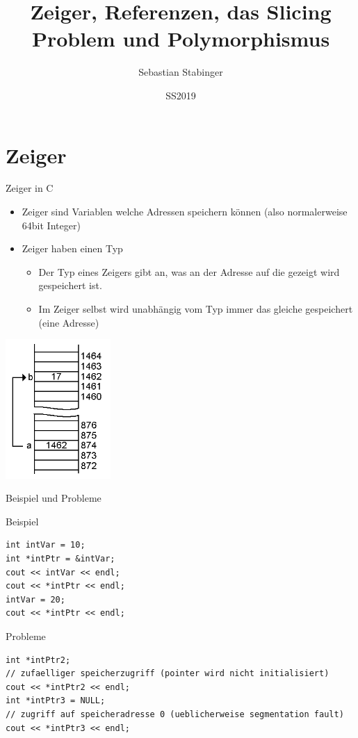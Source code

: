 \documentclass[presentation]{beamer}
\author{Sebastian Stabinger}
\date{SS2019}
\title{Zeiger, Referenzen, das Slicing Problem und Polymorphismus}
\begin{document}
\maketitle
\section{Zeiger}
\label{sec:org67219f1}
\begin{frame}[label={sec:org506cd43}]{Zeiger in C}
\begin{itemize}
\item Zeiger sind Variablen welche Adressen speichern können (also
normalerweise 64bit Integer)
\item Zeiger haben einen Typ
\begin{itemize}
\item Der Typ eines Zeigers gibt an, was an der Adresse auf die gezeigt
wird gespeichert ist.
\item Im Zeiger selbst wird unabhängig vom Typ immer das gleiche
gespeichert (eine Adresse)
\end{itemize}
\end{itemize}
\begin{center}\begin{center}
\includegraphics[width=0.3\textwidth]{img/pointer.png}
\end{center}\end{center}
\end{frame}
\begin{frame}[fragile,label={sec:org4065a98}]{Beispiel und Probleme}
 \begin{block}{Beispiel}
\begin{verbatim}
int intVar = 10;
int *intPtr = &intVar;
cout << intVar << endl;
cout << *intPtr << endl;
intVar = 20;
cout << *intPtr << endl;
\end{verbatim}
\end{block}
\begin{block}{Probleme}
\begin{verbatim}
int *intPtr2;
// zufaelliger speicherzugriff (pointer wird nicht initialisiert)
cout << *intPtr2 << endl;
int *intPtr3 = NULL;
// zugriff auf speicheradresse 0 (ueblicherweise segmentation fault)
cout << *intPtr3 << endl;
\end{verbatim}
\end{block}
\end{frame}
\end{document}
